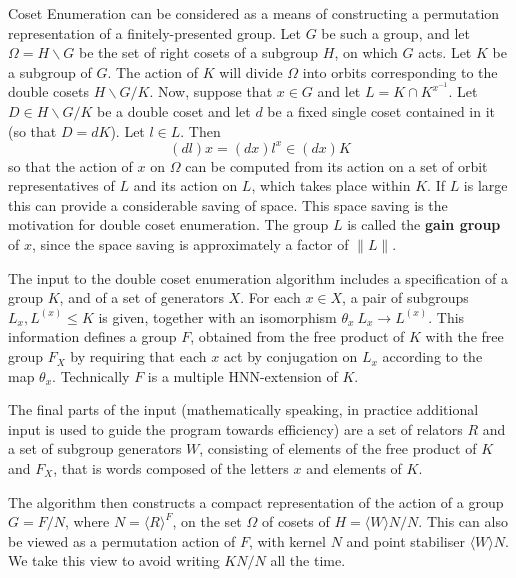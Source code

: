 
Coset Enumeration  can  be  considered as   a   means of   constructing a
permutation representation of a finitely-presented group. Let $G$ be such
a group, and let $\Omega= H\backslash G$ be the set of  right cosets of a
subgroup $H$, on which $G$ acts. Let $K$ be a subgroup of $G$. The action
of $K$   will divide  $\Omega$ into  orbits   corresponding to the double
cosets $H\backslash G/K$. Now, suppose  that $x\in G$ and  let $L = K\cap
K^{x^{-1}}$. Let $D\in H\backslash G/K$ be a  double coset and let $d$ be
a fixed single coset  contained  in it (so  that  $D=dK$). Let $l\in  L$.
Then
\begin{displaymath}
(dl)x = (dx)l^x \in (dx)K
\end{displaymath}
so that the action of $x$ on $\Omega$ can be  computed from its action on
a set of orbit representatives of $L$ and its  action on $L$, which takes
place within $K$. If $L$ is large  this can provide a considerable saving
of  space.  This  space   saving  is   the motivation   for double  coset
enumeration. The group $L$  is called the  {\bf gain group} of $x$, since
the space saving is approximately a factor of $\|L\|$.

The   input  to the   double   coset  enumeration  algorithm includes   a
specification  of a group $K$, and  of a set of  generators $X$. For each
$x\in X$, a pair of subgroups $L_x, L^{(x)}\le K$ is given, together with
an  isomorphism $\theta_x \: L_x  \rightarrow L^{(x)}$.  This information
defines a group $F$, obtained from the free product  of $K$ with the free
group   $F_X$ by  requiring  that each  $x$ act  by  conjugation on $L_x$
according  to  the  map  $\theta_x$.     Technically  $F$ is  a  multiple
HNN-extension of $K$.

The final  parts   of the input  (mathematically   speaking,  in practice
additional input is used to  guide the program  towards efficiency) are a
set of relators $R$  and a set of subgroup  generators $W$, consisting of
elements of the free product of $K$ and $F_X$, that  is words composed of
the letters $x$ and elements of $K$.

The algorithm then constructs a compact representation of the action of a
group  $G = F/N$,  where $N =\langle R\rangle^F$, on  the set $\Omega$ of
cosets of  $H = \langle  W\rangle N/N$.   This can also   be viewed as  a
permutation action of $F$, with kernel $N$  and point stabiliser $\langle
W\rangle N$. We take this view to avoid writing $KN/N$ all the time.

